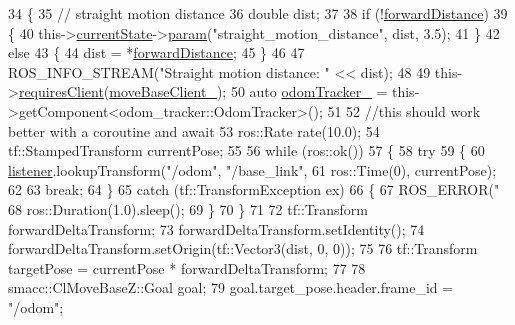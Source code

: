 \begin{DoxyCode}
34     \{
35         \textcolor{comment}{// straight motion distance}
36         \textcolor{keywordtype}{double} dist;
37 
38         \textcolor{keywordflow}{if} (!\hyperlink{classsm__dance__bot_1_1CbNavigateForward_af150b8fb72f2a27b6fef85b6f169b91b}{forwardDistance})
39         \{
40             this->\hyperlink{classsmacc_1_1SmaccClientBehavior_af76fc9b877542ed5caf033f820c107d0}{currentState}->\hyperlink{classsmacc_1_1ISmaccState_a4982f2187ed6da337462721146e8ef70}{param}(\textcolor{stringliteral}{"straight\_motion\_distance"}, dist, 3.5);
41         \}
42         \textcolor{keywordflow}{else}
43         \{
44             dist = *\hyperlink{classsm__dance__bot_1_1CbNavigateForward_af150b8fb72f2a27b6fef85b6f169b91b}{forwardDistance};
45         \}
46 
47         ROS\_INFO\_STREAM(\textcolor{stringliteral}{"Straight motion distance: "} << dist);
48 
49         this->\hyperlink{classsmacc_1_1SmaccClientBehavior_a917f001e763a1059af337bf4e164f542}{requiresClient}(\hyperlink{classsm__dance__bot_1_1CbNavigateForward_aa8925dbb246e8decc95e226818fa63ea}{moveBaseClient\_});
50         \textcolor{keyword}{auto} \hyperlink{classsm__dance__bot_1_1CbNavigateForward_a203a34ea3c943646b29dde9756b1f595}{odomTracker\_} = this->getComponent<odom\_tracker::OdomTracker>();
51 
52         \textcolor{comment}{//this should work better with a coroutine and await}
53         ros::Rate rate(10.0);
54         tf::StampedTransform currentPose;
55 
56         \textcolor{keywordflow}{while} (ros::ok())
57         \{
58             \textcolor{keywordflow}{try}
59             \{
60                 \hyperlink{classsm__dance__bot_1_1CbNavigateForward_a7bda457757f10a2e71eb15c07bf707b4}{listener}.lookupTransform(\textcolor{stringliteral}{"/odom"}, \textcolor{stringliteral}{"/base\_link"},
61                                          ros::Time(0), currentPose);
62 
63                 \textcolor{keywordflow}{break};
64             \}
65             \textcolor{keywordflow}{catch} (tf::TransformException ex)
66             \{
67                 ROS\_ERROR(\textcolor{stringliteral}{"%
68                 ros::Duration(1.0).sleep();
69             \}
70         \}
71 
72         tf::Transform forwardDeltaTransform;
73         forwardDeltaTransform.setIdentity();
74         forwardDeltaTransform.setOrigin(tf::Vector3(dist, 0, 0));
75 
76         tf::Transform targetPose = currentPose * forwardDeltaTransform;
77 
78         smacc::ClMoveBaseZ::Goal goal;
79         goal.target\_pose.header.frame\_id = \textcolor{stringliteral}{"/odom"};
}
\end{DoxyCode}
